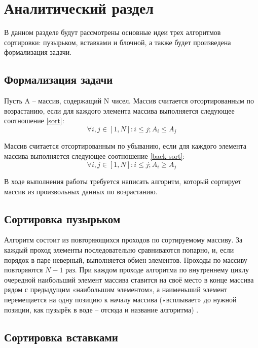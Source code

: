 \section{Аналитический раздел}
В данном разделе будут рассмотрены основные идеи трех алгоритмов сортировки: пузырьком, вставками и блочной, а также будет произведена формализация задачи.

\subsection{Формализация задачи}

Пусть A -- массив, содержащий N чисел.
Массив считается отсортированным по возрастанию, если для каждого элемента массива выполняется следующее соотношение \ref{sort}:
\begin{equation}
	\label{sort}
		\forall i, j   \in [1, N] : i  \leq  j ; A_i \leq A_j 
\end{equation}

Массив считается отсортированным по убыванию, если для каждого элемента массива выполняется следующее соотношение \ref{back-sort}:
\begin{equation}
	\label{back-sort}
		\forall i, j   \in [1, N] : i  \leq  j ; A_i \geq A_j 
\end{equation}

В ходе выполнения работы требуется написать алгоритм, который сортирует массив из произвольных данных по возрастанию.

\subsection{Сортировка пузырьком}

Алгоритм  состоит  из  повторяющихся  проходов  по  сортируемому массиву. 
За каждый проход элементы последовательно сравниваются попарно, и, если порядок в паре неверный, выполняется обмен элементов. 
Проходы  по  массиву повторяются  $N-1$ раз.  
При каждом  проходе  алгоритма  по  внутреннему  циклу  очередной  наибольший  элемент  массива ставится на своё место в конце массива рядом с предыдущим «наибольшим элементом», а наименьший элемент перемещается на одну позицию к  началу  массива  («всплывает»  до  нужной  позиции,  как  пузырёк  в воде -- отсюда  и  название  алгоритма) \cite{book_shagbazyan}.

\subsection{Сортировка вставками}

